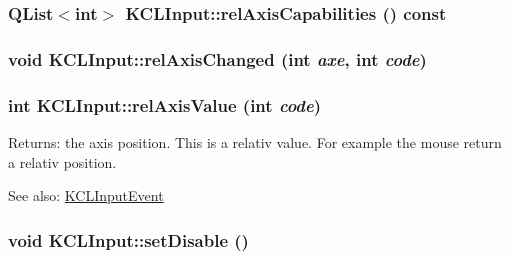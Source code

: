 \hypertarget{class_k_c_l_input_01591a1897e2b8a62b305470ac673fd5}{
\subsubsection[{relAxisCapabilities}]{\setlength{\rightskip}{0pt plus 5cm}QList$<$int$>$ KCLInput::relAxisCapabilities () const}}
\label{class_k_c_l_input_01591a1897e2b8a62b305470ac673fd5}


\hypertarget{class_k_c_l_input_ff1ef872aecc7cd81660f2410cd53246}{
\subsubsection[{relAxisChanged}]{\setlength{\rightskip}{0pt plus 5cm}void KCLInput::relAxisChanged (int {\em axe}, \/  int {\em code})}}
\label{class_k_c_l_input_ff1ef872aecc7cd81660f2410cd53246}


\hypertarget{class_k_c_l_input_9c10138f6d7b8f744f352cc4372ffa25}{
\subsubsection[{relAxisValue}]{\setlength{\rightskip}{0pt plus 5cm}int KCLInput::relAxisValue (int {\em code})}}
\label{class_k_c_l_input_9c10138f6d7b8f744f352cc4372ffa25}


\begin{Desc}
\item[Returns:]the axis position. This is a relativ value. For example the mouse return a relativ position. \end{Desc}
\begin{Desc}
\item[See also:]\hyperlink{class_k_c_l_input_event}{KCLInputEvent} \end{Desc}
\hypertarget{class_k_c_l_input_496552a75e1e157f134e4e0739d25895}{
\subsubsection[{setDisable}]{\setlength{\rightskip}{0pt plus 5cm}void KCLInput::setDisable ()}}
\label{class_k_c_l_input_496552a75e1e157f134e4e0739d25895}


